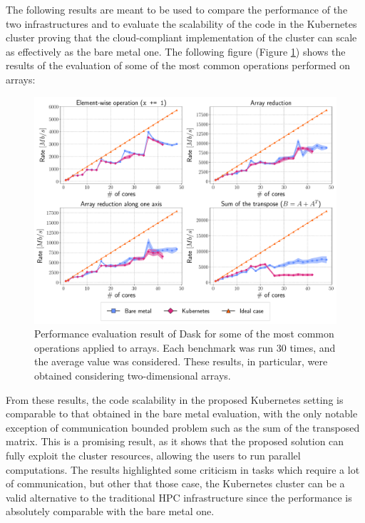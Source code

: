The following results are meant to be used to compare the performance
of the two infrastructures and to evaluate the scalability of the code in the
Kubernetes cluster proving that the cloud-compliant implementation of the
cluster can scale as effectively as the bare metal one.
The following figure (Figure \ref{fig:summary-dask_en}) shows the results of the
evaluation of some of the most common operations performed on arrays:

\begin{figure}
  \centering
  \includegraphics[width=\textwidth]{img/abstract/summary-dask}
  \caption{Performance evaluation result of Dask for some of the most common
    operations applied to arrays. Each benchmark was run 30 times, and the
    average value was considered. These results, in particular, were obtained
    considering two-dimensional arrays.}
  \label{fig:summary-dask_en}
\end{figure}

From these  results, the code scalability in the proposed Kubernetes setting is
comparable to that obtained in the bare metal evaluation, with the only notable
exception of communication bounded problem such as the sum of the transposed
matrix.
This is a promising result, as it shows that the proposed solution can fully
exploit the cluster resources, allowing the users to run parallel computations.
The results highlighted some criticism in tasks which require a lot of
communication, but other that those case, the Kubernetes cluster can be a valid
alternative to the traditional HPC infrastructure since the performance is
absolutely comparable with the bare metal one.

